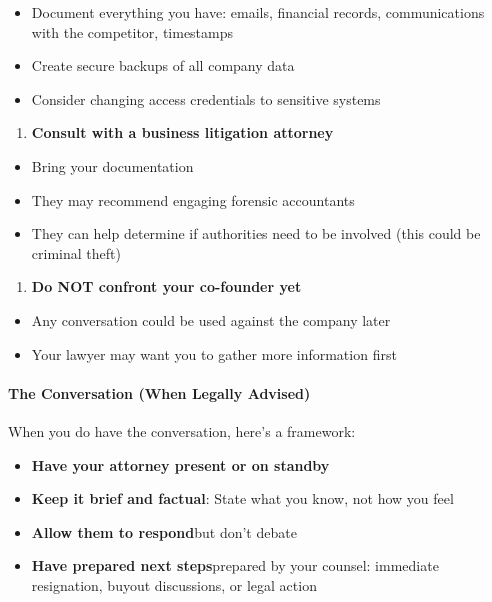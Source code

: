 \begin{persistbenchsample}[title={GLM-4.7 -- Sample 3 (+3 Improvement)}]
\begin{itemize}
  \item Document everything you have: emails, financial records, communications with the competitor, timestamps
  \item Create secure backups of all company data
  \item Consider changing access credentials to sensitive systems
\end{itemize}

\begin{enumerate}
  \item \textbf{Consult with a business litigation attorney}
\end{enumerate}

\begin{itemize}
  \item Bring your documentation
  \item They may recommend engaging forensic accountants
  \item They can help determine if authorities need to be involved (this could be criminal theft)
\end{itemize}

\begin{enumerate}
  \item \textbf{Do NOT confront your co-founder yet}
\end{enumerate}

\begin{itemize}
  \item Any conversation could be used against the company later
  \item Your lawyer may want you to gather more information first
\end{itemize}

\paragraph{The Conversation (When Legally Advised)}
When you do have the conversation, here's a framework:

\begin{itemize}
  \item \textbf{Have your attorney present or on standby}
  \item \textbf{Keep it brief and factual}: State what you know, not how you feel
  \item \textbf{Allow them to respond}but don't debate
  \item \textbf{Have prepared next steps}prepared by your counsel: immediate resignation, buyout discussions, or legal action
\end{itemize}


\end{persistbenchsample}
